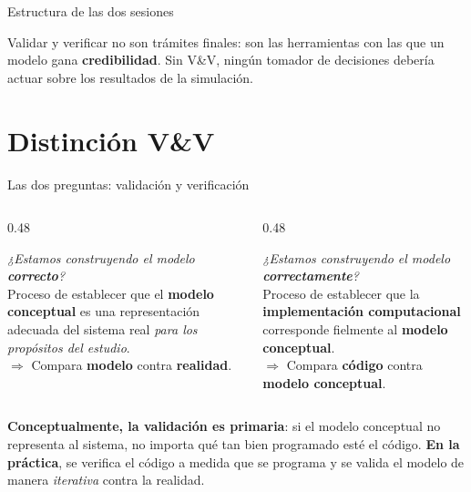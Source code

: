 \documentclass[aspectratio=1610, 10pt]{beamer}
\begin{document}
\begin{frame}{Estructura de las dos sesiones}
  \vspace{4pt}
  \begin{notabox}
    \footnotesize
    Validar y verificar no son trámites finales: son las herramientas con las que
    un modelo gana \textbf{credibilidad}. Sin V\&V, ningún tomador de decisiones
    debería actuar sobre los resultados de la simulación.
  \end{notabox}
\end{frame}

\section{Distinción V\&V}

\begin{frame}{Las dos preguntas: validación y verificación}
  \begin{columns}[T]
    \begin{column}{0.48\textwidth}
      \begin{alertabox}[Validación]
        \footnotesize
        \emph{¿Estamos construyendo el modelo \textbf{correcto}?}\\[2pt]
        Proceso de establecer que el \textbf{modelo conceptual} es una
        representación adecuada del sistema real \emph{para los propósitos
        del estudio}.\\[2pt]
        $\Rightarrow$ Compara \textbf{modelo} contra \textbf{realidad}.
      \end{alertabox}
    \end{column}
    \begin{column}{0.48\textwidth}
      \begin{definicionbox}[Verificación]
        \footnotesize
        \emph{¿Estamos construyendo el modelo \textbf{correctamente}?}\\[2pt]
        Proceso de establecer que la \textbf{implementación computacional}
        corresponde fielmente al \textbf{modelo conceptual}.\\[2pt]
        $\Rightarrow$ Compara \textbf{código} contra \textbf{modelo conceptual}.
      \end{definicionbox}
    \end{column}
  \end{columns}

  \vspace{6pt}
  \begin{notabox}
    \footnotesize
    \textbf{Conceptualmente, la validación es primaria}: si el modelo conceptual no
    representa al sistema, no importa qué tan bien programado esté el código.
    \textbf{En la práctica}, se verifica el código a medida que se programa y se
    valida el modelo de manera \emph{iterativa} contra la realidad.
  \end{notabox}
\end{frame}
\end{document}
